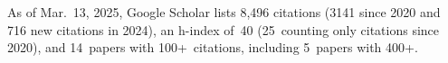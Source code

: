 %
As of Mar.~13, 2025, Google Scholar lists
8,496 citations (3141 since 2020 and 716 new citations in 2024),
an h-index of~40 (25~counting only citations since 2020),
and 14~papers with 100+~citations, including 5~papers with 400+.
